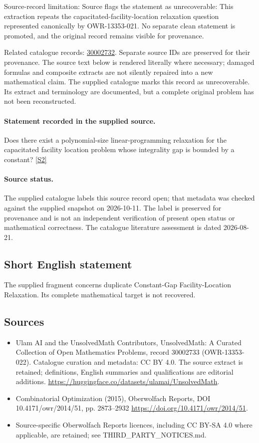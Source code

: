 \documentclass[11pt]{article}
\begin{document}
Source-record limitation: Source flags the statement as unrecoverable: This extraction repeats the capacitated-facility-location relaxation question represented canonically by OWR-13353-021. No separate clean statement is promoted, and the original record remains visible for provenance.

Related catalogue records: \href{https://mehmetmars7.github.io/Erdosproblems-llm-hunter/problem.html?type=open_problems&id=30002732}{30002732}. Separate source IDs are preserved for their provenance.
The source text below is rendered literally where necessary; damaged formulas and composite extracts are not silently repaired into a new mathematical claim.
The supplied catalogue marks this record as unrecoverable. Its extract and terminology are documented, but a complete original problem has not been reconstructed.
\paragraph{Statement recorded in the supplied source.}
Does there exist a polynomial-size linear-programming relaxation for the capacitated facility location problem whose integrality gap is bounded by a constant? \href{https://doi.org/10.4171/owr/2014/51}{[S2]}
\paragraph{Source status.}
The supplied catalogue labels this source record open; that metadata was checked against the supplied snapshot on 2026-10-11. The label is preserved for provenance and is not an independent verification of present open status or mathematical correctness. The catalogue literature assessment is dated 2026-08-21.
\subsection{Short English statement}
The supplied fragment concerns duplicate Constant-Gap Facility-Location Relaxation. Its complete mathematical target is not recovered.
\subsection{Sources}
\begin{itemize}
\item[S1] Ulam AI and the UnsolvedMath Contributors, UnsolvedMath: A Curated Collection of Open Mathematics Problems, record 30002733 (OWR-13353-022). Catalogue curation and metadata: CC BY 4.0. The source extract is retained; definitions, English summaries and qualifications are editorial additions.
\url{https://huggingface.co/datasets/ulamai/UnsolvedMath}.
\item[S2] Combinatorial Optimization (2015), Oberwolfach Reports, DOI 10.4171/owr/2014/51, pp. 2873--2932
\url{https://doi.org/10.4171/owr/2014/51}.
\item Source-specific Oberwolfach Reports licences, including CC BY-SA 4.0 where applicable, are retained; see THIRD\_PARTY\_NOTICES.md.
\end{itemize}
\end{document}
